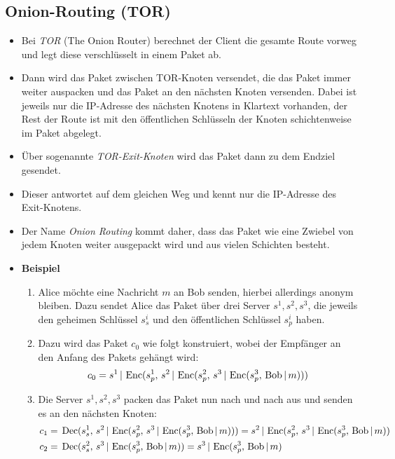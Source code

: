 	\subsection{Onion-Routing (TOR)}
		\begin{itemize}
			\item Bei \textit{TOR} (The Onion Router) berechnet der Client die gesamte Route vorweg und legt diese verschlüsselt in einem Paket ab.
			\item Dann wird das Paket zwischen TOR-Knoten versendet, die das Paket immer weiter auspacken und das Paket an den nächsten Knoten versenden. Dabei ist jeweils nur die IP-Adresse des nächsten Knotens in Klartext vorhanden, der Rest der Route ist mit den öffentlichen Schlüsseln der Knoten schichtenweise im Paket abgelegt.
			\item Über sogenannte \textit{TOR-Exit-Knoten} wird das Paket dann zu dem Endziel gesendet.
			\item Dieser antwortet auf dem gleichen Weg und kennt nur die IP-Adresse des Exit-Knotens.
			\item Der Name \textit{Onion Routing} kommt daher, dass das Paket wie eine Zwiebel von jedem Knoten weiter ausgepackt wird und aus vielen Schichten besteht.
			\item \textbf{Beispiel}
				\begin{enumerate}
					\item Alice möchte eine Nachricht \(m\) an Bob senden, hierbei allerdings anonym bleiben. Dazu sendet Alice das Paket über drei Server \( s^1, s^2, s^3 \), die jeweils den geheimen Schlüssel \( s^i_s \) und den öffentlichen Schlüssel \( s^i_p \) haben.
					\item Dazu wird das Paket \( c_0 \) wie folgt konstruiert, wobei der Empfänger an den Anfang des Pakets gehängt wird:
						\begin{equation*}
							c_0 = s^1 \,\vert\, \operatorname{Enc}(s^1_p,\, s^2 \,\vert\, \operatorname{Enc}(s^2_p,\, s^3 \,\vert\, \operatorname{Enc}(s^3_p,\, \text{Bob} \,\vert\, m)))
						\end{equation*}
					\item Die Server \( s^1, s^2, s^3 \) packen das Paket nun nach und nach aus und senden es an den nächsten Knoten:
						\begin{align*}
							c_1 & =\, \Dec(s^1_s,\, s^2 \,\vert\, \Enc(s^2_p,\, s^3 \,\vert\, \Enc(s^3_p,\, \text{Bob} \,\vert\, m))) = s^2 \,\vert\, \Enc(s^2_p,\, s^3 \,\vert\, \Enc(s^3_p,\, \text{Bob} \,\vert\, m)) \\
							c_2 & =\, \Dec(s^2_s,\, s^3 \,\vert\, \Enc(s^3_p,\, \text{Bob} \,\vert\, m)) = s^3 \,\vert\, \Enc(s^3_p,\, \text{Bob} \,\vert\, m)                                                           \\

\end{align*}
\end{enumerate}
\end{itemize}
